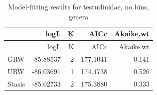 \documentclass[]{article}
\begin{document}
\begin{longtable}[]{@{}lrrrr@{}}
\caption{Model-fitting results for testudinidae, no bins,
genera}\tabularnewline
\toprule
& logL & K & AICc & Akaike.wt\tabularnewline
\midrule
\endfirsthead
\toprule
& logL & K & AICc & Akaike.wt\tabularnewline
\midrule
\endhead
GRW & -85.88537 & 2 & 177.1041 & 0.141\tabularnewline
URW & -86.03691 & 1 & 174.4738 & 0.526\tabularnewline
Stasis & -85.02733 & 2 & 175.3880 & 0.333\tabularnewline
\bottomrule
\end{longtable}
\end{document}
